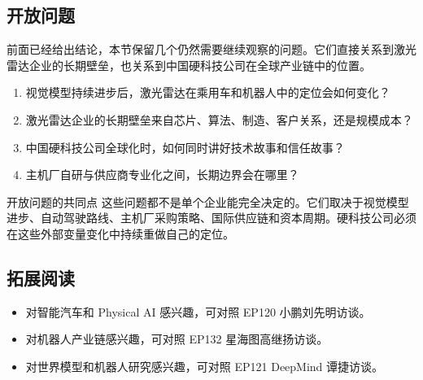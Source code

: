 \subsection{开放问题}

前面已经给出结论，本节保留几个仍然需要继续观察的问题。它们直接关系到激光雷达企业的长期壁垒，也关系到中国硬科技公司在全球产业链中的位置。

\begin{enumerate}
\item 视觉模型持续进步后，激光雷达在乘用车和机器人中的定位会如何变化？
\item 激光雷达企业的长期壁垒来自芯片、算法、制造、客户关系，还是规模成本？
\item 中国硬科技公司全球化时，如何同时讲好技术故事和信任故事？
\item 主机厂自研与供应商专业化之间，长期边界会在哪里？
\end{enumerate}

\begin{warningbox}{开放问题的共同点}
这些问题都不是单个企业能完全决定的。它们取决于视觉模型进步、自动驾驶路线、主机厂采购策略、国际供应链和资本周期。硬科技公司必须在这些外部变量变化中持续重做自己的定位。
\end{warningbox}

\subsection{拓展阅读}

\begin{itemize}
\item 对智能汽车和 Physical AI 感兴趣，可对照 EP120 小鹏刘先明访谈。
\item 对机器人产业链感兴趣，可对照 EP132 星海图高继扬访谈。
\item 对世界模型和机器人研究感兴趣，可对照 EP121 DeepMind 谭捷访谈。
\end{itemize}



